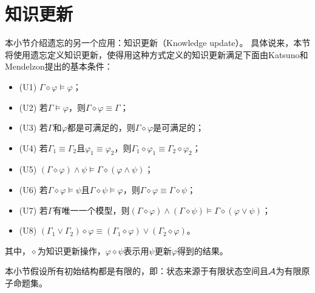 \section{知识更新}\label{chapter04:sec:update}
本小节介绍遗忘的另一个应用：知识更新（Knowledge update）。
具体说来，本节将使用遗忘定义知识更新，使得用这种方式定义的知识更新满足下面由Katsuno和Mendelzon提出的基本条件\cite{katsuno91mendelzon}：
\begin{itemize}
	\item (U1)  $\Gamma \diamond \varphi \models \varphi$；
	\item (U2) 若$\Gamma \models \varphi$，则$\Gamma \diamond \varphi \equiv \Gamma$；
	\item (U3) 若$\Gamma$和$\varphi$都是可满足的，则$\Gamma \diamond \varphi$是可满足的；
	\item (U4) 若$\Gamma_1\equiv \Gamma_2$且$\varphi_1 \equiv \varphi_2$，则$\Gamma_1 \diamond \varphi_1 \equiv \Gamma_2 \diamond \varphi_2$；
	\item (U5) $(\Gamma \diamond \varphi) \wedge \psi \models \Gamma \diamond(\varphi \wedge \psi)$；
	\item (U6) 若$\Gamma \diamond \varphi \models \psi$且$\Gamma \diamond \psi \models \varphi$，则$\Gamma \diamond \varphi \equiv \Gamma \diamond \psi$；
	\item (U7) 若$\Gamma$有唯一一个模型，则$(\Gamma \diamond \varphi) \wedge (\Gamma \diamond \psi) \models \Gamma \diamond (\varphi \vee \psi)$；
	\item (U8) $(\Gamma_1 \vee \Gamma_2) \diamond \varphi \equiv (\Gamma_1 \diamond \varphi) \vee  (\Gamma_2 \diamond \varphi)$。
\end{itemize}
其中，$\diamond$为知识更新操作，$\varphi \diamond \psi$表示用$\psi$更新$\varphi$得到的结果。

本小节假设所有初始结构都是有限的，即：状态来源于有限状态空间且${\cal A}$为有限原子命题集。

%	


